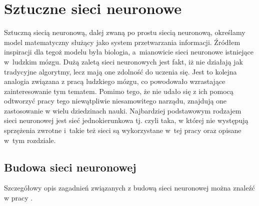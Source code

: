 
\section{Sztuczne sieci neuronowe}\label{rozdzial_sieci}
Sztuczną siecią neuronową, dalej zwaną po prostu siecią neuronową, określamy model matematyczny służący jako system przetwarzania informacji. Źródłem inspiracji dla tegoż modelu była biologia, a~mianowicie sieci neuronowe istniejące w~ludzkim mózgu. Dużą zaletą sieci neuronowych jest fakt, iż nie działają jak tradycyjne algorytmy, lecz mają one zdolność do uczenia się. Jest to kolejna analogia związana z pracą ludzkiego mózgu, co powodowało wzrastające zainteresowanie tym tematem. Pomimo tego, że nie udało się z ich pomocą odtworzyć pracy tego niewątpliwie niesamowitego narządu, znajdują one zastosowanie w wielu dziedzinach nauki. Najbardziej podstawowym rodzajem sieci neuronowej jest sieć jednokierunkowa tj. czyli taka, w której nie występują sprzężenia zwrotne i~takie też sieci są wykorzystane w~tej pracy oraz opisane w~tym rozdziale.

%
\subsection{Budowa sieci neuronowej}
Szczegółowy opis zagadnień związanych z budową sieci neuronowej można znaleźć w pracy \cite{tadeusiewicz}.
